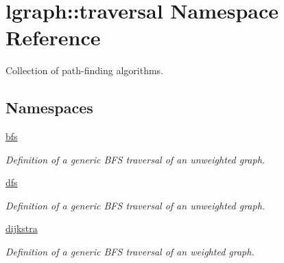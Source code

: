 \hypertarget{namespacelgraph_1_1traversal}{}\section{lgraph\+:\+:traversal Namespace Reference}
\label{namespacelgraph_1_1traversal}


Collection of path-\/finding algorithms.  


\subsection*{Namespaces}
\begin{DoxyCompactItemize}
\item 
 \hyperlink{namespacelgraph_1_1traversal_1_1bfs}{bfs}
\begin{DoxyCompactList}\small\item\em Definition of a generic B\+FS traversal of an unweighted graph. \end{DoxyCompactList}\item 
 \hyperlink{namespacelgraph_1_1traversal_1_1dfs}{dfs}
\begin{DoxyCompactList}\small\item\em Definition of a generic B\+FS traversal of an unweighted graph. \end{DoxyCompactList}\item 
 \hyperlink{namespacelgraph_1_1traversal_1_1dijkstra}{dijkstra}
\begin{DoxyCompactList}\small\item\em Definition of a generic B\+FS traversal of an weighted graph. \end{DoxyCompactList}\end{DoxyCompactItemize}
